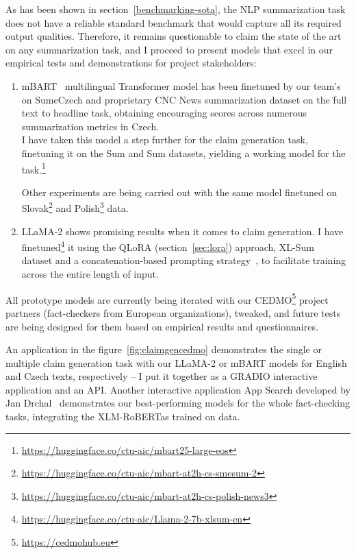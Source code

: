 As has been shown in section~\ref{benchmarking-sota}, the NLP summarization task does not have a reliable standard benchmark that would capture all its required output qualities. Therefore, it remains questionable to claim the state of the art on any summarization task, and I proceed to present models that excel in our empirical tests and demonstrations for project stakeholders:

\begin{enumerate}
    \item {\techbf mBART}~\cite{mbart} multilingual Transformer model has been finetuned by our team's~\cite{krotil} on SumeCzech and proprietary CNC News summarization dataset on the \"{full text to headline} task, obtaining encouraging scores across numerous summarization metrics in Czech.\\
    I have taken this model a step further for the claim generation task, finetuning it on the {\FCZ}Sum and {\CTK}Sum datasets, yielding a working model for the task.\footnote{
    \url{https://huggingface.co/ctu-aic/mbart25-large-eos}}

    Other experiments are being carried out with the same model finetuned on Slovak\footnote{\url{https://huggingface.co/ctu-aic/mbart-at2h-cs-smesum-2}} and Polish\footnote{\url{https://huggingface.co/ctu-aic/mbart-at2h-cs-polish-news3}} data.
    \item {\techbf LLaMA-2} shows promising results when it comes to claim generation.
    I have finetuned\footnote{\url{https://huggingface.co/ctu-aic/Llama-2-7b-xlsum-en}} it using the QLoRA (section~\ref{sec:lora}) approach, XL-Sum~\cite{xlsum} dataset and a concatenation-based prompting strategy~\cite{llama2}, to facilitate training across the entire length of input.
    
\end{enumerate}

All prototype models are currently being iterated with our CEDMO\footnote{\url{https://cedmohub.eu}} project partners (fact-checkers from European organizations),  tweaked, and future tests are being designed for them based on empirical results and questionnaires.

An application in the figure~\ref{fig:claimgencedmo} demonstrates the single or multiple claim generation task with our LLaMA-2 or mBART models for English and Czech texts, respectively -- I put it together as a GRADIO interactive application and an API.
Another interactive application App Search  developed by Jan Drchal~\cite{mlynar} demonstrates our best-performing models for the whole fact-checking tasks, integrating the XLM-RoBERTas trained on \FCZNLI data.


